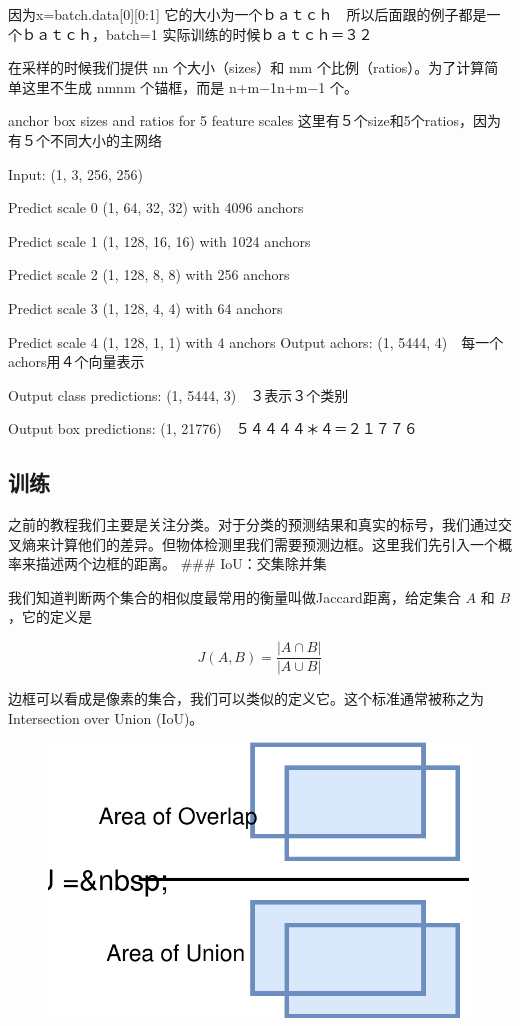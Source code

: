 \documentclass[11pt]{article}
\makeatletter
\def\maxwidth{\ifdim\Gin@nat@width>\linewidth\linewidth
    \else\Gin@nat@width\fi}
\let\Oldincludegraphics\includegraphics
\renewcommand{\includegraphics}[1]{\Oldincludegraphics[width=.8\maxwidth]{#1}}
\makeatother
\begin{document}
因为x=batch.data{[}0{]}{[}0:1{]}
它的大小为一个ｂａｔｃｈ　所以后面跟的例子都是一个ｂａｔｃｈ，batch=1
实际训练的时候ｂａｔｃｈ＝３２

在采样的时候我们提供 nn 个大小（sizes）和 mm
个比例（ratios）。为了计算简单这里不生成 nmnm 个锚框，而是 n+m−1n+m−1
个。

anchor box sizes and ratios for 5 feature scales
这里有５个size和5个ratios，因为有５个不同大小的主网络

Input: (1, 3, 256, 256)

Predict scale 0 (1, 64, 32, 32) with 4096 anchors

Predict scale 1 (1, 128, 16, 16) with 1024 anchors

Predict scale 2 (1, 128, 8, 8) with 256 anchors

Predict scale 3 (1, 128, 4, 4) with 64 anchors

Predict scale 4 (1, 128, 1, 1) with 4 anchors Output achors: (1, 5444,
4)　每一个achors用４个向量表示

Output class predictions: (1, 5444, 3)　３表示３个类别

Output box predictions: (1, 21776)　５４４４４＊４＝２１７７６

\subsection{训练}\label{ux8badux7ec3}

之前的教程我们主要是关注分类。对于分类的预测结果和真实的标号，我们通过交叉熵来计算他们的差异。但物体检测里我们需要预测边框。这里我们先引入一个概率来描述两个边框的距离。
\#\#\# IoU：交集除并集

我们知道判断两个集合的相似度最常用的衡量叫做Jaccard距离，给定集合 \(A\)
和 \(B\)，它的定义是

\[J(A,B) =
\frac{|A\cap B|}{| A \cup B|}\]

边框可以看成是像素的集合，我们可以类似的定义它。这个标准通常被称之为
Intersection over Union (IoU)。

\begin{figure}
\centering
\includegraphics{../img/iou.svg}
\caption{}
\end{figure}
\end{document}
